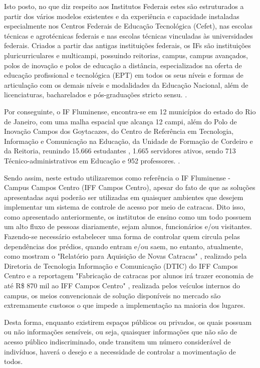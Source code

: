 Isto posto, no que diz respeito aos Institutos Federais estes são estruturados a partir dos vários modelos existentes e da experiência e capacidade instaladas especialmente nos Centros Federais de Educação Tecnológica (Cefet), nas escolas técnicas e agrotécnicas federais e nas escolas técnicas vinculadas às universidades federais. Criados a partir das antigas instituições federais, os IFs são instituições pluricurriculares e multicampi, possuindo reitorias, campus, campus avançados, polos de inovação e polos de educação a distância, especializados na oferta de educação profissional e tecnológica (EPT) em todos os seus níveis e formas de articulação com os demais níveis e modalidades da Educação Nacional, além de licenciaturas, bacharelados e pós-graduações stricto sensu. \cite{institutofederal}.



Por conseguinte, o IF Fluminense, encontra-se em 12 municípios do estado do Rio de Janeiro, com uma malha espacial que alcança 12 campi, além do Polo de Inovação Campos dos Goytacazes, do Centro de Referência em Tecnologia, Informação e Comunicação na Educação, da Unidade de Formação de Cordeiro e da Reitoria, reunindo 15.666 estudantes \cite{iffemnumeros}, 1.665 servidores ativos, sendo 713 Técnico-administrativos em Educação e 952 professores. \cite{iffluminense}. 


Sendo assim, neste estudo utilizaremos como referência o IF Fluminense - Campus Campos Centro (IFF Campos Centro), apesar do fato de que as soluções apresentadas aqui poderão ser utilizadas em quaisquer ambientes que desejem implementar um sistema de controle de acesso por meio de catracas. Dito isso, como apresentado anteriormente, os institutos de ensino como um todo possuem um alto fluxo de pessoas
diariamente, sejam alunos, funcionários e/ou visitantes. Fazendo-se necessário
estabelecer uma forma de controlar quem circula pelas dependências dos prédios, quando
entram e/ou saem, no entanto, atualmente, como mostram o "Relatório para Aquisição de Novas Catracas" \cite{relatorio},  realizado pela Diretoria de
Tecnologia Informação e Comunicação (DTIC) do IFF Campos Centro e a reportagem "Fabricação de catracas por alunos irá trazer economia de até R\$ 870 mil ao IFF Campos Centro" \cite{reportagem}, realizada pelos veículos internos do campus,  os meios convencionais de solução disponíveis
no mercado são extremamente custosos o que impede a implementação na maioria dos lugares.



Desta forma, enquanto existirem espaços públicos ou privados, os quais possuam ou não
informações sensíveis, ou seja, quaisquer informações que não são de acesso público indiscriminado, onde transitem um número considerável de indivíduos, haverá o
desejo e a necessidade de controlar a movimentação de todos.

